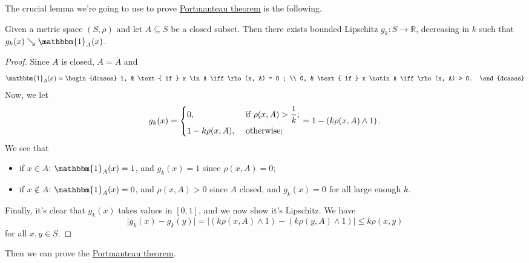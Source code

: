 The crucial lemma we're going to use to prove \hyperref[thm:Portmanteau]{Portmanteau theorem} is the following.

\begin{lemma}\label{lma:lec3}
	Given a metric space \((S, \rho )\) and let \(A \subseteq S\) be a closed subset. Then there exists bounded Lipschitz \(g_k \colon S \to \mathbb{R} \), decreasing in \(k\) such that \(g_k (x) \searrow \mathbbm{1}_{A}(x) \).
\end{lemma}
\begin{proof}
	Since \(A\) is closed, \(A = \overline{A} \) and
	\[
		\mathbbm{1}_{A}(x) = \begin{dcases}
			1, & \text{ if } x \in A \iff \rho (x, A) = 0 ;   \\
			0, & \text{ if } x \notin A \iff \rho (x, A) > 0.
		\end{dcases}
	\]
	Now, we let
	\[
		g_k (x) = \begin{dcases}
			0,                  & \text{ if } \rho (x, A) > \frac{1}{k} ; \\
			1 - k \rho (x, A) , & \text{ otherwise} ;
		\end{dcases}
		= 1 - \left( k \rho (x, A) \land 1 \right) .
	\]
	We see that
	\begin{itemize}
		\item if \(x\in A\): \(\mathbbm{1}_{A} (x) = 1\), and \(g_k(x) = 1\) since \(\rho (x, A) = 0\);
		\item if \(x \notin A\): \(\mathbbm{1}_{A} (x) = 0\), and \(\rho (x, A) > 0\) since \(A\) closed, and \(g_k(x) = 0\) for all large enough \(k\).
	\end{itemize}
	Finally, it's clear that \(g_k(x)\) takes values in \([0, 1]\), and we now show it's Lipschitz. We have
	\[
		\vert g_k(x) - g_k(y) \vert
		= \vert ( k \rho (x, A) \land 1 ) - ( k \rho (y, A) \land 1 ) \vert
		\leq k \rho (x, y)
	\]
	for all \(x, y \in S\).
\end{proof}

Then we can prove the \hyperref[thm:Portmanteau]{Portmanteau theorem}.

